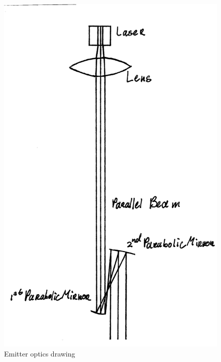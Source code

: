 \begin{figure}[ht!]
\centering
\includegraphics[scale = 0.7]{chapters/img/EmitterOptics.png}
\caption{Emitter optics drawing}
\label{fig:EmitterOptics}
\end{figure}

